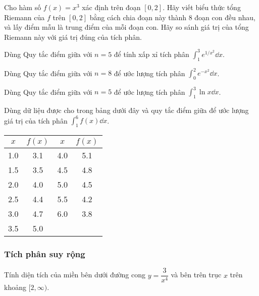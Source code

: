 \begin{exercise}
    Cho hàm số $f(x) = x^3$ xác định trên đoạn $[0, 2]$. Hãy viết biểu thức tổng Riemann của $f$ trên $[0, 2]$ bằng cách chia đoạn này thành 8 đoạn con đều nhau, và lấy điểm mẫu là trung điểm của mỗi đoạn con. Hãy so sánh giá trị của tổng Riemann này với giá trị đúng của tích phân.
\end{exercise}

\begin{exercise}
    Dùng Quy tắc điểm giữa với $n = 5$ để tính xấp xỉ tích phân $\int_1^3 e^{1/x^2} \dd x$.
\end{exercise}

\begin{exercise}
    Dùng Quy tắc điểm giữa với $n = 8$ để ước lượng tích phân $\int_0^2 e^{-x^2} \dd x$.
\end{exercise}

\begin{exercise}
    Dùng Quy tắc điểm giữa với $n = 5$ để ước lượng tích phân $\int_1^3 \ln x \dd x$.
\end{exercise}

\begin{exercise}
    Dùng dữ liệu được cho trong bảng dưới đây và quy tắc điểm giữa để ước lượng giá trị của tích phân $\int_1^6 f(x) \dd x$.
    \begin{center}
        \begin{tabular}{|c|c||c|c|}
            \hline
            $x$ & $f(x)$ & $x$ & $f(x)$ \\
            \hline
            1.0 & 3.1 & 4.0 & 5.1 \\
            1.5 & 3.5 & 4.5 & 4.8 \\
            2.0 & 4.0 & 5.0 & 4.5 \\
            2.5 & 4.4 & 5.5 & 4.2 \\
            3.0 & 4.7 & 6.0 & 3.8 \\
            3.5 & 5.0 & & \\
            \hline
        \end{tabular}
    \end{center}
\end{exercise}

\subsubsection{Tích phân suy rộng}

\begin{exercise}
    Tính diện tích của miền bên dưới đường cong $y = \dfrac{3}{x^4}$ và bên trên trục $x$ trên khoảng $[2, \infty)$.
\end{exercise}

